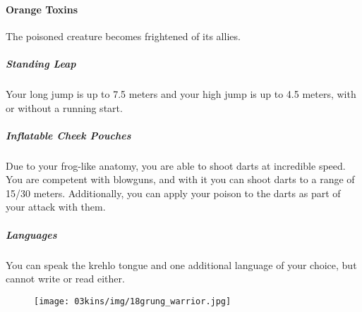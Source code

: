 \paragraph{Orange Toxins} The poisoned creature becomes frightened of its allies.


\subparagraph{Standing Leap} Your long jump is up to 7.5 meters and your high jump is up to 4.5 meters, with or without a running start.


\subparagraph{Inflatable Cheek Pouches} Due to your frog-like anatomy, you are able to shoot darts at incredible speed.
You are competent with blowguns, and with it you can shoot darts to a range of 15/30 meters.
Additionally, you can apply your poison to the darts as part of your attack with them.


\subparagraph{Languages} You can speak the krehlo tongue and one additional language of your choice, but cannot write or read either.

\begin{figure}[!b]
    \centering
    \texttt{[image: 03kins/img/18grung\_warrior.jpg]}
\end{figure}


\newpage
